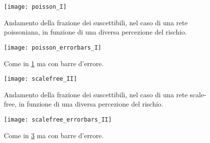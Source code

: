 \begin{figure}
		\begin{center}
			\texttt{[image: poisson\_I]}
			\caption{Andamento della frazione dei suscettibili, nel caso di una rete poissoniana, in funzione di una diversa percezione del rischio.}
			\label{fig:sim_poisson}
		\end{center}
\end{figure}
%
\begin{figure}
		\begin{center}
			\texttt{[image: poisson\_errorbars\_I]}
			\caption{Come in \cref{fig:sim_poisson} ma con barre d'errore.}
			\label{fig:sim_poisson2}
		\end{center}
\end{figure}
%
\begin{figure}
		\begin{center}
			\texttt{[image: scalefree\_II]}
			\caption{Andamento della frazione dei suscettibili, nel caso di una rete scale-free, in funzione di una diversa percezione del rischio.}
			\label{fig:sim_scalefree}
		\end{center}
\end{figure}	
%
\begin{figure}
		\begin{center}
			\texttt{[image: scalefree\_errorbars\_II]}
			\caption{Come in \cref{fig:sim_scalefree} ma con barre d'errore.}
			\label{fig:sim_scalefree2}
		\end{center}
\end{figure}	
